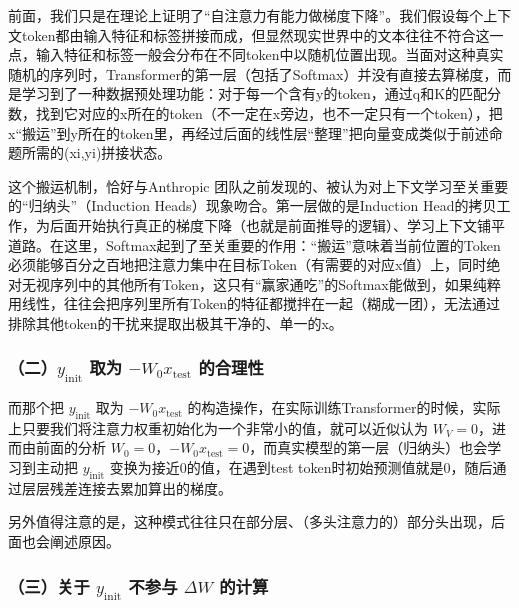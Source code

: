 前面，我们只是在理论上证明了``自注意力有能力做梯度下降''。我们假设每个上下文token都由输入特征和标签拼接而成，但显然现实世界中的文本往往不符合这一点，输入特征和标签一般会分布在不同token中以随机位置出现。当面对这种真实随机的序列时，Transformer的第一层（包括了Softmax）并没有直接去算梯度，而是学习到了一种数据预处理功能：对于每一个含有y的token，通过q和K的匹配分数，找到它对应的x所在的token（不一定在x旁边，也不一定只有一个token），把x``搬运''到y所在的token里，再经过后面的线性层``整理''把向量变成类似于前述命题所需的(xi,yi)拼接状态。

这个搬运机制，恰好与Anthropic 团队之前发现的、被认为对上下文学习至关重要的``归纳头''（Induction Heads）现象吻合。第一层做的是Induction Head的拷贝工作，为后面开始执行真正的梯度下降（也就是前面推导的逻辑）、学习上下文铺平道路。在这里，Softmax起到了至关重要的作用：``搬运''意味着当前位置的Token必须能够百分之百地把注意力集中在目标Token（有需要的对应x值）上，同时绝对无视序列中的其他所有Token，这只有``赢家通吃''的Softmax能做到，如果纯粹用线性，往往会把序列里所有Token的特征都搅拌在一起（糊成一团），无法通过排除其他token的干扰来提取出极其干净的、单一的x。

\hypertarget{ux4e8cy_mathrminit-ux53d6ux4e3a--w_0x_mathrmtest-ux7684ux5408ux7406ux6027}{%
\subsubsection{\texorpdfstring{（二）\(y_{\mathrm{init}}\) 取为 \(-W_0x_{\mathrm{test}}\) 的合理性}{（二）y\_\{\textbackslash mathrm\{init\}\} 取为 -W\_0x\_\{\textbackslash mathrm\{test\}\} 的合理性}}\label{ux4e8cy_mathrminit-ux53d6ux4e3a--w_0x_mathrmtest-ux7684ux5408ux7406ux6027}}

而那个把 \(y_{\mathrm{init}}\) 取为 \(-W_0x_{\mathrm{test}}\) 的构造操作，在实际训练Transformer的时候，实际上只要我们将注意力权重初始化为一个非常小的值，就可以近似认为 \(W_V=0\)，进而由前面的分析 \(W_0=0\)，\(-W_0x_{\mathrm{test}}=0\)，而真实模型的第一层（归纳头）也会学习到主动把 \(y_{\mathrm{init}}\) 变换为接近0的值，在遇到test token时初始预测值就是0，随后通过层层残差连接去累加算出的梯度。

另外值得注意的是，这种模式往往只在部分层、（多头注意力的）部分头出现，后面也会阐述原因。

\hypertarget{ux4e09ux5173ux4e8e-y_mathrminit-ux4e0dux53c2ux4e0e-delta-w-ux7684ux8ba1ux7b97}{%
\subsubsection{\texorpdfstring{（三）关于 \(y_{\mathrm{init}}\) 不参与 \(\Delta W\) 的计算}{（三）关于 y\_\{\textbackslash mathrm\{init\}\} 不参与 \textbackslash Delta W 的计算}}\label{ux4e09ux5173ux4e8e-y_mathrminit-ux4e0dux53c2ux4e0e-delta-w-ux7684ux8ba1ux7b97}}


